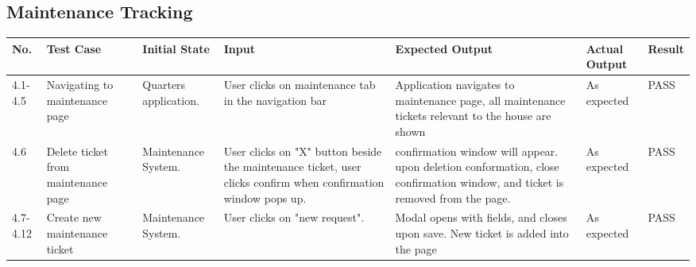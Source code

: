 \documentclass[12pt]{article}
\begin{document}
\subsection{Maintenance Tracking}
\begin{longtable}{|p{1.5cm}|p{2.5cm}|p{2.5cm}|p{3cm}|p{3cm}|p{1.75cm}|p{1.25cm}|}
\hline
\textbf{No.} & \textbf{Test Case}  & \textbf{Initial State} & \textbf{Input} & \textbf{Expected Output} & \textbf{Actual Output} & \textbf{Result}\\ 
\hline
4.1-4.5 & Navigating to maintenance page & Quarters application. & User clicks on maintenance tab in the navigation bar & Application navigates to maintenance page, all maintenance tickets relevant to the house are shown & As expected & PASS\\ 
\hline
4.6 & Delete ticket from maintenance page & Maintenance System. & User clicks on "X" button beside the maintenance ticket, user clicks confirm when confirmation window pops up.& confirmation window will appear. upon deletion conformation, close confirmation window, and ticket is removed from the page. & As expected & PASS\\
\hline
4.7-4.12 & Create new maintenance ticket & Maintenance System. & User clicks on "new request". & Modal opens with fields, and closes upon save. New ticket is added into the page & As expected & PASS\\
\hline
\end{longtable}

\end{document}
